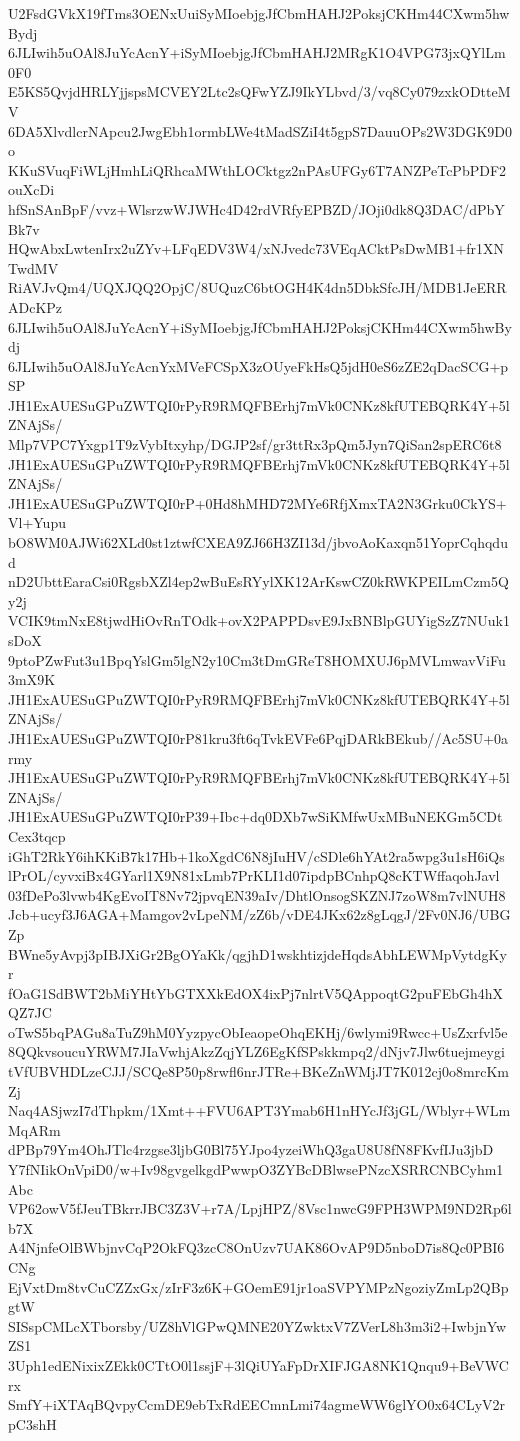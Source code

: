 U2FsdGVkX19fTms3OENxUuiSyMIoebjgJfCbmHAHJ2PoksjCKHm44CXwm5hwBydj
6JLIwih5uOAl8JuYcAcnY+iSyMIoebjgJfCbmHAHJ2MRgK1O4VPG73jxQYlLm0F0
E5KS5QvjdHRLYjjspsMCVEY2Ltc2sQFwYZJ9IkYLbvd/3/vq8Cy079zxkODtteMV
6DA5XlvdlcrNApcu2JwgEbh1ormbLWe4tMadSZiI4t5gpS7DauuOPs2W3DGK9D0o
KKuSVuqFiWLjHmhLiQRhcaMWthLOCktgz2nPAsUFGy6T7ANZPeTcPbPDF2ouXcDi
hfSnSAnBpF/vvz+WlsrzwWJWHc4D42rdVRfyEPBZD/JOji0dk8Q3DAC/dPbYBk7v
HQwAbxLwtenIrx2uZYv+LFqEDV3W4/xNJvedc73VEqACktPsDwMB1+fr1XNTwdMV
RiAVJvQm4/UQXJQQ2OpjC/8UQuzC6btOGH4K4dn5DbkSfcJH/MDB1JeERRADcKPz
6JLIwih5uOAl8JuYcAcnY+iSyMIoebjgJfCbmHAHJ2PoksjCKHm44CXwm5hwBydj
6JLIwih5uOAl8JuYcAcnYxMVeFCSpX3zOUyeFkHsQ5jdH0eS6zZE2qDacSCG+pSP
JH1ExAUESuGPuZWTQI0rPyR9RMQFBErhj7mVk0CNKz8kfUTEBQRK4Y+5lZNAjSs/
Mlp7VPC7Yxgp1T9zVybItxyhp/DGJP2sf/gr3ttRx3pQm5Jyn7QiSan2spERC6t8
JH1ExAUESuGPuZWTQI0rPyR9RMQFBErhj7mVk0CNKz8kfUTEBQRK4Y+5lZNAjSs/
JH1ExAUESuGPuZWTQI0rP+0Hd8hMHD72MYe6RfjXmxTA2N3Grku0CkYS+Vl+Yupu
bO8WM0AJWi62XLd0st1ztwfCXEA9ZJ66H3ZI13d/jbvoAoKaxqn51YoprCqhqdud
nD2UbttEaraCsi0RgsbXZl4ep2wBuEsRYylXK12ArKswCZ0kRWKPEILmCzm5Qy2j
VCIK9tmNxE8tjwdHiOvRnTOdk+ovX2PAPPDsvE9JxBNBlpGUYigSzZ7NUuk1sDoX
9ptoPZwFut3u1BpqYslGm5lgN2y10Cm3tDmGReT8HOMXUJ6pMVLmwavViFu3mX9K
JH1ExAUESuGPuZWTQI0rPyR9RMQFBErhj7mVk0CNKz8kfUTEBQRK4Y+5lZNAjSs/
JH1ExAUESuGPuZWTQI0rP81kru3ft6qTvkEVFe6PqjDARkBEkub//Ac5SU+0army
JH1ExAUESuGPuZWTQI0rPyR9RMQFBErhj7mVk0CNKz8kfUTEBQRK4Y+5lZNAjSs/
JH1ExAUESuGPuZWTQI0rP39+Ibc+dq0DXb7wSiKMfwUxMBuNEKGm5CDtCex3tqcp
iGhT2RkY6ihKKiB7k17Hb+1koXgdC6N8jIuHV/cSDle6hYAt2ra5wpg3u1sH6iQs
lPrOL/cyvxiBx4GYarl1X9N81xLmb7PrKLI1d07ipdpBCnhpQ8cKTWffaqohJavl
03fDePo3lvwb4KgEvoIT8Nv72jpvqEN39aIv/DhtlOnsogSKZNJ7zoW8m7vlNUH8
Jcb+ucyf3J6AGA+Mamgov2vLpeNM/zZ6b/vDE4JKx62z8gLqgJ/2Fv0NJ6/UBGZp
BWne5yAvpj3pIBJXiGr2BgOYaKk/qgjhD1wskhtizjdeHqdsAbhLEWMpVytdgKyr
fOaG1SdBWT2bMiYHtYbGTXXkEdOX4ixPj7nlrtV5QAppoqtG2puFEbGh4hXQZ7JC
oTwS5bqPAGu8aTuZ9hM0YyzpycObIeaopeOhqEKHj/6wlymi9Rwcc+UsZxrfvl5e
8QQkvsoucuYRWM7JIaVwhjAkzZqjYLZ6EgKfSPskkmpq2/dNjv7Jlw6tuejmeygi
tVfUBVHDLzeCJJ/SCQe8P50p8rwfl6nrJTRe+BKeZnWMjJT7K012cj0o8mrcKmZj
Naq4ASjwzI7dThpkm/1Xmt++FVU6APT3Ymab6H1nHYcJf3jGL/Wblyr+WLmMqARm
dPBp79Ym4OhJTlc4rzgse3ljbG0Bl75YJpo4yzeiWhQ3gaU8U8fN8FKvfIJu3jbD
Y7fNIikOnVpiD0/w+Iv98gvgelkgdPwwpO3ZYBcDBlwsePNzcXSRRCNBCyhm1Abc
VP62owV5fJeuTBkrrJBC3Z3V+r7A/LpjHPZ/8Vsc1nwcG9FPH3WPM9ND2Rp6lb7X
A4NjnfeOlBWbjnvCqP2OkFQ3zcC8OnUzv7UAK86OvAP9D5nboD7is8Qc0PBI6CNg
EjVxtDm8tvCuCZZxGx/zIrF3z6K+GOemE91jr1oaSVPYMPzNgoziyZmLp2QBpgtW
SISspCMLcXTborsby/UZ8hVlGPwQMNE20YZwktxV7ZVerL8h3m3i2+IwbjnYwZS1
3Uph1edENixixZEkk0CTtO0l1ssjF+3lQiUYaFpDrXIFJGA8NK1Qnqu9+BeVWCrx
SmfY+iXTAqBQvpyCcmDE9ebTxRdEECmnLmi74agmeWW6glYO0x64CLyV2rpC3shH

